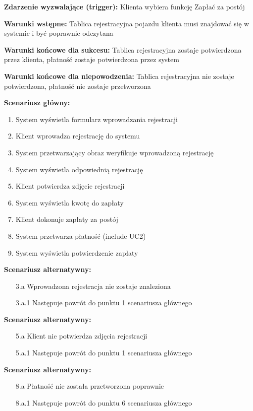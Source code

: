 \hspace{0cm}\textbf{Zdarzenie wyzwalające (trigger): }Klienta wybiera funkcję Zapłać za postój

\hspace{0cm}\textbf{Warunki wstępne: }Tablica rejestracyjna pojazdu klienta musi znajdować się w systemie i być poprawnie odczytana

\hspace{0cm}\textbf{Warunki końcowe dla sukcesu: }
Tablica rejestracyjna zostaje potwierdzona przez klienta, płatność zostaje potwierdzona przez system

\hspace{0cm}\textbf{Warunki końcowe dla niepowodzenia: }Tablica rejestracyjna nie zostaje potwierdzona, płatność nie zostaje przetworzona \newline

\hspace{0cm}\textbf{Scenariusz główny: }
\begin{enumerate}
\item System wyświetla formularz wprowadzania rejestracji
\item Klient wprowadza rejestrację do systemu
\item System przetwarzający obraz weryfikuje wprowadzoną rejestrację
\item System wyświetla odpowiednią rejestrację
\item Klient potwierdza zdjęcie rejestracji
\item System wyświetla kwotę do zapłaty
\item Klient dokonuje zapłaty za postój
\item System przetwarza płatność (include UC2)
\item System wyświetla potwierdzenie zapłaty
\end{enumerate}
\hspace{0cm}\textbf{Scenariusz alternatywny: }
\begin{enumerate}
\item[3.a] Wprowadzona rejestracja nie zostaje znaleziona
\item[3.a.1] Następuje powrót do punktu 1 scenariusza głównego 
\end{enumerate}
\hspace{0cm}\textbf{Scenariusz alternatywny: }
\begin{enumerate}
	\item[5.a] Klient nie potwierdza zdjęcia rejestracji
	\item[5.a.1] Następuje powrót do punktu 1 scenariusza głównego
\end{enumerate}
\hspace{0cm}\textbf{Scenariusz alternatywny: }
\begin{enumerate}
\item[8.a] Płatność nie została przetworzona poprawnie
\item[8.a.1] Następuje powrót do punktu 6 scenariusza głównego 
\end{enumerate}
